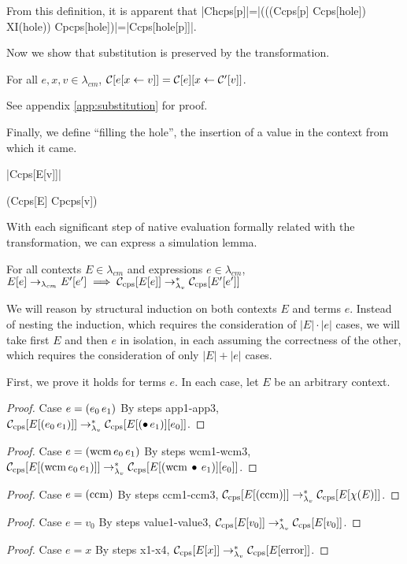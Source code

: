 From this definition, it is apparent that \scheme|Chcps[p]|=\scheme|(((Ccps[p] Ccps[hole]) XI(hole)) Cpcps[hole])|=\scheme|Ccps[hole[p]]|.

Now we show that substitution is preserved by the transformation.

\begin{lemma}[Substitution]
\label{lem:substitution}
For all $e,x,v\in\lambda_{cm}$, $\mathcal{C}[e[x\leftarrow v]]=\mathcal{C}[e][x\leftarrow \mathcal{C}'[v]]$.
\end{lemma}

See appendix \ref{app:substitution} for proof.

Finally, we define ``filling the hole'', the insertion of a value in the context from which it came.

\begin{schemedefinition}{\scheme|Ccps[E[v]]|}
\begin{schemeblock}
\begin{schemedisplay}
(Ccps[E] Cpcps[v])
\end{schemedisplay}
\end{schemeblock}
\end{schemedefinition}

With each significant step of native evaluation formally related with the transformation, we can express a simulation lemma.

\begin{lemma}[Simulation]
For all contexts $E\in\lambda_{cm}$ and expressions $e\in\lambda_{cm}$, $E[e]\rightarrow_{\lambda_{cm}} E'[e']\implies\mathcal{C}_{\mathrm{cps}}[E[e]]\rightarrow_{\lambda_v}^{*}\mathcal{C}_{\mathrm{cps}}[E'[e']]$
\end{lemma}

We will reason by structural induction on both contexts $E$ and terms $e$. Instead of
nesting the induction, which requires the consideration of $|E|\cdot|e|$ cases, we will
take first $E$ and then $e$ in isolation, in each assuming the correctness of the other,
which requires the consideration of only $|E|+|e|$ cases.

First, we prove it holds for terms $e$. In each case, let $E$ be an arbitrary context.
\begin{proof}{Case $e=(e_0\,e_1)$}
By steps app1-app3, $\mathcal{C}_{\mathrm{cps}}[E[(e_0\,e_1)]]\rightarrow_{\lambda_v}^{*}\mathcal{C}_{\mathrm{cps}}[E[(\bullet\,e_1)][e_0]]$.
\end{proof}
\begin{proof}{Case $e=(\mathrm{wcm}\,e_0\,e_1)$}
By steps wcm1-wcm3, $\mathcal{C}_{\mathrm{cps}}[E[(\mathrm{wcm}\,e_0\,e_1)]]\rightarrow_{\lambda_v}^{*}\mathcal{C}_{\mathrm{cps}}[E[(\mathrm{wcm}\,\bullet\,e_1)][e_0]]$.
\end{proof}
\begin{proof}{Case $e=(\mathrm{ccm})$}
By steps ccm1-ccm3, $\mathcal{C}_{\mathrm{cps}}[E[(\mathrm{ccm})]]\rightarrow_{\lambda_v}^{*}\mathcal{C}_{\mathrm{cps}}[E[\chi(E)]]$.
\end{proof}
\begin{proof}{Case $e=v_0$}
By steps value1-value3, $\mathcal{C}_{\mathrm{cps}}[E[v_0]]\rightarrow_{\lambda_v}^{*}\mathcal{C}_{\mathrm{cps}}[E[v_0]]$.
\end{proof}
\begin{proof}{Case $e=x$}
By steps x1-x4, $\mathcal{C}_{\mathrm{cps}}[E[x]]\rightarrow_{\lambda_v}^{*}\mathcal{C}_{\mathrm{cps}}[E[\mathrm{error}]]$.
\end{proof}

